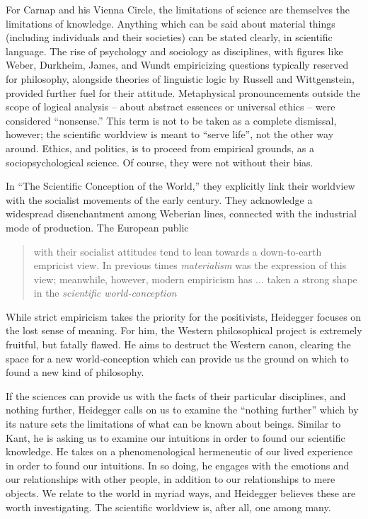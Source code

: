 \documentclass[leqno, 12pt]{turabian-researchpaper}
\begin{document}
	For Carnap and his Vienna Circle, the limitations of science are themselves
	the limitations of knowledge. Anything which can be said about material things
	(including individuals and their societies) can be stated clearly, in
	scientific language. The rise of psychology and sociology as disciplines, with
	figures like Weber, Durkheim, James, and Wundt empiricizing questions typically
	reserved for philosophy, alongside theories of linguistic logic by Russell and
	Wittgenstein, provided further fuel for their attitude. Metaphysical
	pronouncements outside the scope of logical analysis -- about abstract essences
	or universal ethics -- were considered \enquote{nonsense.} This term is not to
	be taken as a complete dismissal, however; the scientific worldview is meant to
	\enquote{serve life}, not the other way around. Ethics, and politics, is to
	proceed from empirical grounds, as a sociopsychological science. Of course, they
	were not without their bias.

	In \enquote{The Scientific Conception of the World,} \nocite{hahn1973} they explicitly
	link their worldview with the socialist movements of the early 
	century. They acknowledge a widespread disenchantment among Weberian lines,
	connected with the industrial mode of production. The European public \blockquote[{\cite[21f]{hahn1973}}]{with their socialist attitudes tend to lean towards a down-to-earth empricist view. In previous times \emph{materialism} was the expression of this view; meanwhile, however, modern empiricism has ... taken a strong shape in the \emph{scientific world-conception}}.

	While strict empiricism takes the priority for the positivists, Heidegger
	focuses on the lost sense of meaning. For him, the Western philosophical
	project is extremely fruitful, but fatally flawed. He aims to destruct the
	Western canon, clearing the space for a new world-conception which can provide
	us the ground on which to found a new kind of philosophy.

	If the sciences can provide us with the facts of their particular disciplines,
	and nothing further, Heidegger calls on us to examine the \enquote{nothing further}
	which by its nature sets the limitations of what can be known about beings. Similar
	to Kant, he is asking us to examine our intuitions in order to found our
	scientific knowledge. He takes on a phenomenological hermeneutic of our lived experience
	in order to found our intuitions. In so doing, he engages with the emotions and
	our relationships with other people, in addition to our relationships to mere
	objects. We relate to the world in myriad ways, and Heidegger believes these
	are worth investigating. The scientific worldview is, after all, one among many.
\end{document}

